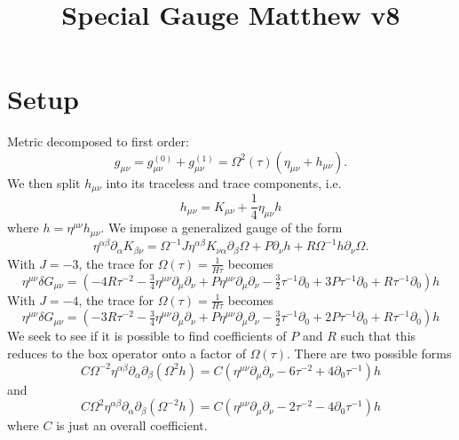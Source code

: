 \documentclass[10pt,letterpaper]{article}
\title{Special Gauge Matthew v8}
\date{}
\begin{document}
\maketitle
\noindent
\section*{Setup}
Metric decomposed to first order:
\begin{equation}
g_{\mu\nu} = g^{(0)}_{\mu\nu} + g^{(1)}_{\mu\nu} = \Omega^2(\tau)(\eta_{\mu\nu}+h_{\mu\nu}).
\end{equation}
We then split $h_{\mu\nu}$ into its traceless and trace components, i.e.
\begin{equation}
	h_{\mu\nu} = K_{\mu\nu} + \frac 14 \eta_{\mu\nu}h
\end{equation}
where $h = \eta^{\mu\nu}h_{\mu\nu}$. 
We impose a generalized gauge of the form
\begin{equation}
	\eta^{\alpha\beta}\partial_{\alpha}K_{\beta\nu} = \Omega^{-1} J \eta^{\alpha\beta}K_{\nu\alpha}\partial_\beta \Omega + P \partial_\nu h + R \Omega^{-1} h \partial_\nu \Omega.
\end{equation}
With $J=-3$, the trace for $\Omega(\tau) = \frac{1}{H\tau}$ becomes
\begin{equation}
	\eta^{\mu\nu}\delta G_{\mu\nu} = 
	(-4 R \tau^{-2} -  \tfrac{3}{4} \eta^{\mu \nu} \partial_{\mu} \partial_{\nu} + P \eta^{\mu \nu} \partial_{\mu} \partial_{\nu} -  \tfrac{3}{2} \tau^{-1} \partial_{0} + 3 P \tau^{-1} \partial_{0} + R \tau^{-1} \partial_{0}) h
\end{equation}
With $J=-4$, the trace for $\Omega(\tau) = \frac{1}{H\tau}$ becomes
\begin{equation}
	\eta^{\mu\nu}\delta G_{\mu\nu} = 
(-3 R \tau^{-2} -  \tfrac{3}{4} \eta^{\mu \nu} \partial_{\mu} \partial_{\nu} + P \eta^{\mu \nu} \partial_{\mu} \partial_{\nu} -  \tfrac{3}{2} \tau^{-1} \partial_{0} + 2 P \tau^{-1} \partial_{0} + R \tau^{-1} \partial_{0}) h
\end{equation}
We seek to see if it is possible to find coefficients of $P$ and $R$ such that this reduces to the box operator onto a factor of $\Omega(\tau)$. There are two possible forms
\begin{equation}
	C\Omega^{-2}\eta^{\alpha\beta}\partial_\alpha\partial_\beta (\Omega^2 h)
	= C(\eta^{\mu \nu} \partial_{\mu} \partial_{\nu} - 6 \tau^{-2} + 4 \partial_{0} \tau^{-1}) h
\end{equation}
and
\begin{equation}
	C\Omega^{2}\eta^{\alpha\beta}\partial_\alpha\partial_\beta (\Omega^{-2} h)
	=C(\eta^{\mu \nu} \partial_{\mu} \partial_{\nu} - 2 \tau^{-2} - 4 \partial_{0} \tau^{-1}) h
\end{equation}
where $C$ is just an overall coefficient. 
\\ 
\end{document}
